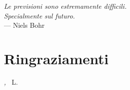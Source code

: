 
\cleardoublepage
{}
{}

\begin{flushright}{\slshape
	Le previsioni sono estremamente difficili. \\
	Specialmente sul futuro.} \\\medskip
    --- Niels Bohr
\end{flushright}

\bigskip

\begingroup
\let\clearpage\relax
\let\cleardoublepage\relax
\let\cleardoublepage\relax

\chapter*{Ringraziamenti}

\lipsum[1]

\bigskip

\noindent\textit{\mylocation, \MakeTextLowercase{\mytime}}
\hfill ~L.

\endgroup

